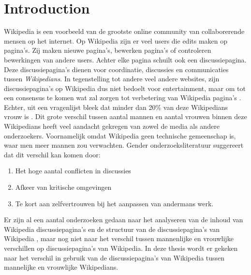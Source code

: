 \section{Introduction}
\label{sec:intro}

Wikipedia is een voorbeeld van de grootste online community van collaborerende mensen op het internet. Op Wikipedia zijn er veel users die edits maken op pagina's. Zij maken nieuwe pagina's, bewerken pagina's of controleren bewerkingen van andere users. Achter elke pagina schuilt ook een discussiepagina. Deze discussiepagina's dienen voor coordinatie, discussies en communicaties tussen \textit{Wikipedians}. In tegenstelling tot andere veel andere websites, zijn discussiepagina's op Wikipedia dus niet bedoelt voor entertainment, maar om tot een consensus te komen wat zal zorgen tot verbetering van Wikipedia pagina's \citep{laniado2011wikipedians}.  Echter, uit een vragenlijst bleek dat minder dan 20\% van deze Wikipedians vrouw is \citep{glott2010analysis}. Dit grote verschil tussen aantal mannen en aantal vrouwen binnen deze Wikipedians heeft veel aandacht gekregen van zowel de media als andere onderzoekers. Voornamelijk omdat Wikipedia geen technische gemeenschap is, waar men meer mannen zou verwachten. Gender onderzoeksliteratuur \citep{collier2012conflict} suggereert dat dit verschil kan komen door:
\begin{enumerate}
    \item Het hoge aantal conflicten in discussies
    \item Afkeer van kritische omgevingen
    \item Te kort aan zelfvertrouwen bij het aanpassen van andermans werk.
\end{enumerate}  
Er zijn al een aantal onderzoeken gedaan naar het analyseren van de inhoud van Wikipedia discussiepagina's \citep{viegas2007talk} en de structuur van de discussiepagina's van Wikipedia \citep{laniado2011wikipedians}, maar nog niet naar het verschil tussen mannenlijke en vrouwlijke verschillen op discussiepagina's van Wikipedia. In deze thesis wordt er gekeken naar het verschil in gebruik van de discussiepagina's van Wikipedia tussen mannelijke en vrouwlijke Wikipedians.



